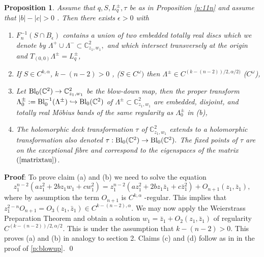 \documentclass{amsart}
\newtheorem{proposition}[theorem]{Proposition}
\begin{document}
\begin{proposition} \label{p:blowup-n}
Assume that $ q, S, L_q^\pm, \tau$ be as in Proposition \ref{p:11n} and assume that $|b| - |c| > 0$ . Then there exists  $\epsilon > 0$ with
\begin{enumerate}
\item[(a)]  $F_n^{-1}( S \cap B_\epsilon) $ contains a union of two embedded totally real discs which we denote by $\Lambda^+ \cup \Lambda^- \subset {\mathbb{C}}^2_{z_1,w_1},$ and which intersect transversely at the origin and $T_{(0,0)}\Lambda^\pm=L^\pm_{ q}$,
\item[(b)] If $S\in C^{k,\alpha}$,  $k-(n-2) > 0$ , ($S \in C^\omega)$ then $\Lambda^\pm\in C^{(k-(n-2))/2, \alpha/2)}$ ($C^\omega$),
\item[(c)] Let 
${\rm Bl}_0(\mathbb{C}^2) \to \mathbb{C}^2_{z_1,w_1}$ 
be the blow-down map, then the proper transform $\Lambda_0^\pm :=  {\rm Bl}^{-1}_0(\Lambda^\pm) \hookrightarrow \rm{Bl}_0({\mathbb{C}}^2)$ of $\Lambda^\pm \subset{\mathbb{C}}^2_{z_1,w_1}$ are embedded, disjoint, and totally real M\"obius bands of  the same regularity as $\Lambda_0^\pm$ in (b),
\item[(d)] The holomorphic deck transformation $\tau$ of ${\mathbb{C}}^2_{z_1,w_1}$ extends to a holomorphic transformation also denoted $\tau : \rm{Bl}_0({\mathbb{C}}^2) \to \rm{Bl}_0({\mathbb{C}}^2).$ The fixed points of $\tau$ are on the exceptional fibre and correspond to the eigenspaces of the matrix  $(\ref{matrixtau})$. 
\end{enumerate}
\end{proposition}
\noindent
{\bf Proof}:
To prove claim (a) and (b) we need to solve the equation
\[
z_1^{n-2}(az_1^2 + 2bz_1w_1 + c w_1^2 ) = z_1^{n-2} (az_1^2 + 2bz_1\bar{z}_1 + c \bar{z}_1^2) + O_{n+1}(z_1,\bar{z}_1),
\]
where by assumption the term $O_{n+1}$ is $C^{k,\alpha}$ -regular. This implies that $z_1^{2-n}O_{n+1} = O_3(z_1,\bar z_1) \in C^{k-(n-2),\alpha}.$ We may now apply the Weierstrass Preparation Theorem and obtain a solution $w_1 = \bar z_1 + O_2(z_1,\bar z_1)$ of regularity $C^{(k-(n-2))/2,\alpha/2}.$ This is under the assumption that $k-(n-2) > 0.$ This proves (a) and (b) in analogy to section 2. Claims (c) and (d) follow as in in the proof of \eqref{p:blowup}.
\qed
\end{document}

